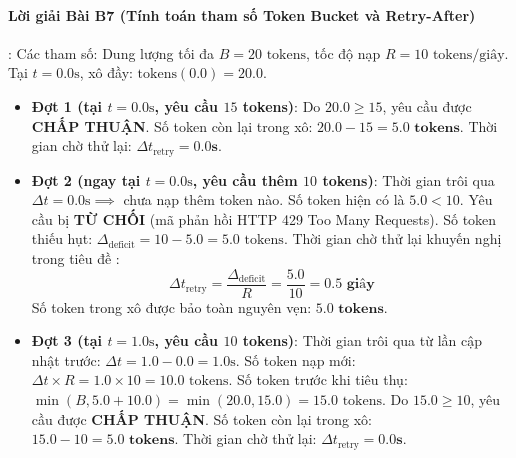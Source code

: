 \paragraph{Lời giải Bài B7 (Tính toán tham số Token Bucket và Retry-After)}:
Các tham số: Dung lượng tối đa $B = 20\text{ tokens}$, tốc độ nạp $R = 10\text{ tokens/giây}$. Tại $t = 0.0\text{s}$, xô đầy: $\text{tokens}(0.0) = 20.0$.
\begin{itemize}
  \item \textbf{Đợt 1 (tại $t = 0.0\text{s}$, yêu cầu $15$ tokens)}:
  Do $20.0 \ge 15$, yêu cầu được \textbf{CHẤP THUẬN}.
  Số token còn lại trong xô: $20.0 - 15 = \mathbf{5.0\text{ tokens}}$.
  Thời gian chờ thử lại: $\Delta t_{\text{retry}} = \mathbf{0.0\text{s}}$.

  \item \textbf{Đợt 2 (ngay tại $t = 0.0\text{s}$, yêu cầu thêm $10$ tokens)}:
  Thời gian trôi qua $\Delta t = 0.0\text{s} \implies$ chưa nạp thêm token nào.
  Số token hiện có là $5.0 < 10$. Yêu cầu bị \textbf{TỪ CHỐI} (mã phản hồi HTTP 429 Too Many Requests).
  Số token thiếu hụt: $\Delta_{\text{deficit}} = 10 - 5.0 = 5.0\text{ tokens}$.
  Thời gian chờ thử lại khuyến nghị trong tiêu đề :
  \begin{equation*}
  \Delta t_{\text{retry}} = \frac{\Delta_{\text{deficit}}}{R} = \frac{5.0}{10} = \mathbf{0.5\text{ giây}}
  \end{equation*}
  Số token trong xô được bảo toàn nguyên vẹn: $\mathbf{5.0\text{ tokens}}$.

  \item \textbf{Đợt 3 (tại $t = 1.0\text{s}$, yêu cầu $10$ tokens)}:
  Thời gian trôi qua từ lần cập nhật trước: $\Delta t = 1.0 - 0.0 = 1.0\text{s}$.
  Số token nạp mới: $\Delta t \times R = 1.0 \times 10 = 10.0\text{ tokens}$.
  Số token trước khi tiêu thụ: $\min(B, 5.0 + 10.0) = \min(20.0, 15.0) = 15.0\text{ tokens}$.
  Do $15.0 \ge 10$, yêu cầu được \textbf{CHẤP THUẬN}.
  Số token còn lại trong xô: $15.0 - 10 = \mathbf{5.0\text{ tokens}}$.
  Thời gian chờ thử lại: $\Delta t_{\text{retry}} = \mathbf{0.0\text{s}}$.
\end{itemize}

